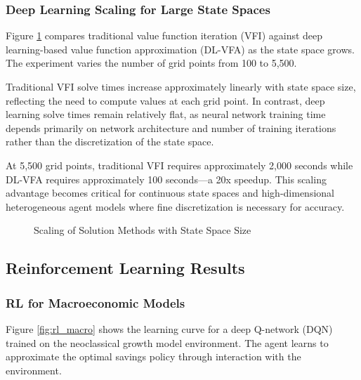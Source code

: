 \documentclass[12pt]{article}
\begin{document}
\subsubsection{Deep Learning Scaling for Large State Spaces}

Figure \ref{fig:dl_scaling} compares traditional value function iteration (VFI) against deep learning-based value function approximation (DL-VFA) as the state space grows. The experiment varies the number of grid points from 100 to 5,500.

Traditional VFI solve times increase approximately linearly with state space size, reflecting the need to compute values at each grid point. In contrast, deep learning solve times remain relatively flat, as neural network training time depends primarily on network architecture and number of training iterations rather than the discretization of the state space.

At 5,500 grid points, traditional VFI requires approximately 2,000 seconds while DL-VFA requires approximately 100 seconds---a 20x speedup. This scaling advantage becomes critical for continuous state spaces and high-dimensional heterogeneous agent models where fine discretization is necessary for accuracy.

\begin{figure}[H]
\centering
{}
\caption{Scaling of Solution Methods with State Space Size}
\label{fig:dl_scaling}
\end{figure}

\subsection{Reinforcement Learning Results}

\subsubsection{RL for Macroeconomic Models}

Figure \ref{fig:rl_macro} shows the learning curve for a deep Q-network (DQN) trained on the neoclassical growth model environment. The agent learns to approximate the optimal savings policy through interaction with the environment.
\end{document}
